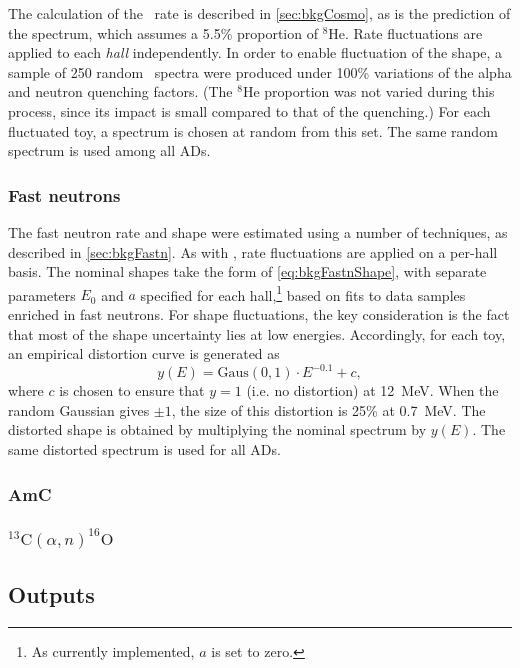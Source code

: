 \documentclass[../thesis.tex]{subfiles}
\begin{document}
The calculation of the \LiHe\ rate is described in \autoref{sec:bkgCosmo}, as is the prediction of the spectrum, which assumes a 5.5\% proportion of $^8$He. Rate fluctuations are applied to each \emph{hall} independently. In order to enable fluctuation of the shape, a sample of 250 random \LiHe\ spectra were produced under 100\% variations of the alpha and neutron quenching factors. (The $^8$He proportion was not varied during this process, since its impact is small compared to that of the quenching.) For each fluctuated toy, a spectrum is chosen at random from this set. The same random spectrum is used among all ADs.

\subsubsection{Fast neutrons}

The fast neutron rate and shape were estimated using a number of techniques, as described in \autoref{sec:bkgFastn}. As with \LiHe, rate fluctuations are applied on a per-hall basis. The nominal shapes take the form of \autoref{eq:bkgFastnShape}, with separate parameters $E_0$ and $a$ specified for each hall,\footnote{As currently implemented, $a$ is set to zero.} based on fits to data samples enriched in fast neutrons. For shape fluctuations, the key consideration is the fact that most of the shape uncertainty lies at low energies. Accordingly, for each toy, an empirical distortion curve is generated as
\begin{equation*}
  y(E) = \mathrm{Gaus}(0,1) \cdot E^{-0.1} + c,
\end{equation*}
where $c$ is chosen to ensure that $y = 1$ (i.e. no distortion) at 12~MeV. When the random Gaussian gives $\pm 1$, the size of this distortion is 25\% at 0.7~MeV. The distorted shape is obtained by multiplying the nominal spectrum by $y(E)$. The same distorted spectrum is used for all ADs.

\subsubsection{AmC}

\subsubsection{$^{13}\mathrm{C}(\alpha,n)^{16}\mathrm{O}$}

\subsection{Outputs}
\label{sec:fitToyOutputs}
\end{document}
